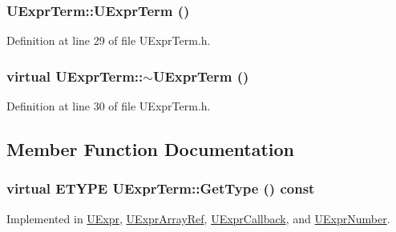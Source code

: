 \begin{CompactItemize}
{\subsubsection[{UExprTerm}]{\setlength{\rightskip}{0pt plus 5cm}UExprTerm::UExprTerm ()}}
\label{class_u_expr_term_a3d517174174a67f8991f3da8dc42df0}




Definition at line 29 of file UExprTerm.h.\hypertarget{class_u_expr_term_4043e63cb432640ba504864e31a62af3}{
\subsubsection[{$\sim$UExprTerm}]{\setlength{\rightskip}{0pt plus 5cm}virtual UExprTerm::$\sim$UExprTerm ()}}
\label{class_u_expr_term_4043e63cb432640ba504864e31a62af3}




Definition at line 30 of file UExprTerm.h.

\subsection{Member Function Documentation}
\hypertarget{class_u_expr_term_fc66ae4dfe6a112d107183840d753562}{
\subsubsection[{GetType}]{\setlength{\rightskip}{0pt plus 5cm}virtual {\bf ETYPE} UExprTerm::GetType () const}}
\label{class_u_expr_term_fc66ae4dfe6a112d107183840d753562}




Implemented in \hyperlink{class_u_expr_ff255fe132b396d771c34978d6e048f9}{UExpr}, \hyperlink{class_u_expr_array_ref_89284f8ec703cb0dd7314a731c593f3d}{UExprArrayRef}, \hyperlink{class_u_expr_callback_231e95e9e737d1ecfa27c5bb6a660be8}{UExprCallback}, and \hyperlink{class_u_expr_number_e0235cdd37c30e7cfa51bb3f8a739e05}{UExprNumber}.\hypertarget{class_u_expr_term_85274403764fb0e4cc701a0374fd6592}{
}
\end{CompactItemize}
